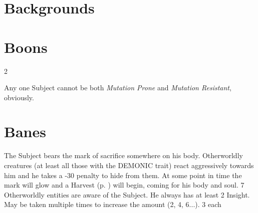 \vspace{-20mm}
\section{Backgrounds}
\label{sec:backgroundlist}
\vspace{10mm}

\section{Boons}
\vspace{8mm}
\begin{multicols}{2}
\begin{exampleblock}
	Any one Subject cannot be both \emph{Mutation Prone} and \emph{Mutation Resistant}, obviously.
\end{exampleblock}
\end{multicols}

\section{Banes}
	{The Subject bears the mark of sacrifice somewhere on his body.
		Otherworldly creatures (at least all those with the DEMONIC trait)
		react aggressively towards him
		and he takes a -30 penalty to hide from them.
		At some point in time the mark will glow and a Harvest (p. \pageref{anomaly:harvest}) will begin,
		coming for his body and soul.
	}
	{7}
	{}
	{Otherworldly entities are aware of the Subject.
		He always has at least 2 Insight.
		May be taken multiple times to increase the amount (2, 4, 6...).}
	{3}
	{each}

